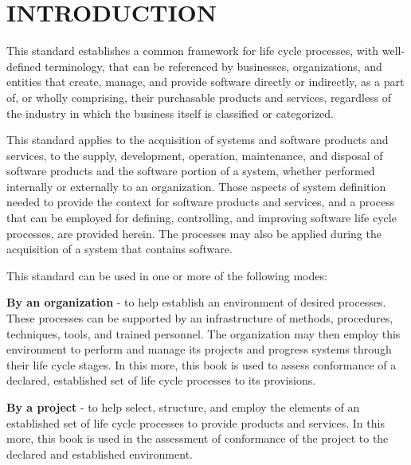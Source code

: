 \section{INTRODUCTION}
\begin{adjustwidth}{0em}{0pt}

	This standard establishes a common framework for life cycle processes, with well-defined terminology, that can be referenced by businesses, organizations, and entities that create, manage, and provide software directly or indirectly, as a part of, or wholly comprising, their purchasable products and services, regardless of the industry in which the business itself is classified or categorized. 

	This standard applies to the acquisition of systems and software products and services, to the supply, development, operation, maintenance, and disposal of software products and the software portion of a system, whether performed internally or externally to an organization. Those aspects of system definition needed to provide the context for software products and services, and a process that can be employed for defining, controlling, and improving software life cycle processes, are provided herein. The processes may also be applied during the acquisition of a system that contains software.

	This standard can be used in one or more of the following modes:\\

		\begin{compactitem}

			\item {\bf By an organization} - to help establish an environment of desired processes. These processes can be supported by an infrastructure of methods, procedures, techniques, tools, and trained personnel. The organization may then employ this environment to perform and manage its projects and progress systems through their life cycle stages. In this more, this book is used to assess conformance of a declared, established set of life cycle processes to its provisions. \\

			\item {\bf By a project} - to help select, structure, and employ the elements of an established set of life cycle processes to provide products and services. In this more, this book is used in the assessment of conformance of the project to the declared and established environment. \\


\end{compactitem}
\end{adjustwidth}
